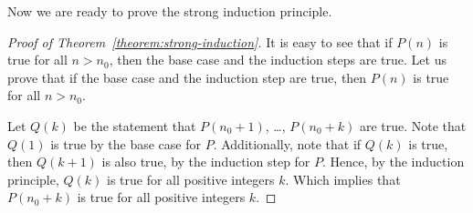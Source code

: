 Now we are ready to prove the strong induction principle.
\begin{proof}[Proof of Theorem~\ref{theorem:strong-induction}]
    It is easy to see that if $P(n)$ is true for all $n > n_0$, then the base
    case and the induction steps are true. Let us prove that if the base case and
    the induction step are true, then $P(n)$ is true for all $n > n_0$.

    Let $Q(k)$ be the statement that $P(n_0 + 1)$, \dots, $P(n_0 + k)$ are true.
    Note that $Q(1)$ is true by the base case for $P$. Additionally, note that if
    $Q(k)$ is true, then $Q(k + 1)$ is also true, by the induction step for $P$.
    Hence, by the induction principle, $Q(k)$ is true for all positive integers
    $k$. Which implies that $P(n_0 + k)$ is true for all positive integers $k$.
\end{proof}


